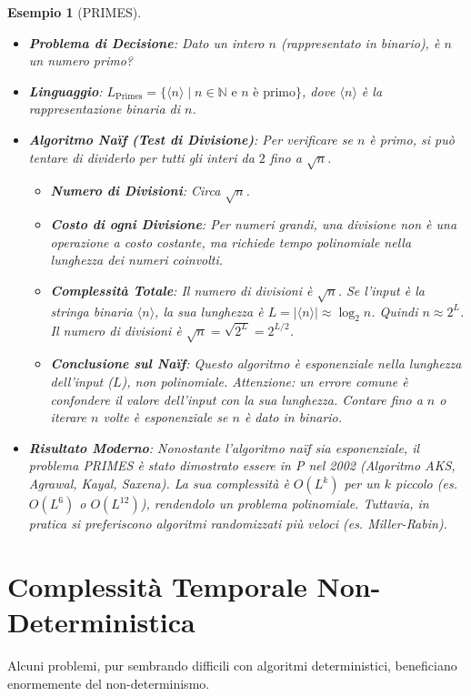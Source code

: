 \documentclass[a4paper]{article}
\newtheorem{example}{Esempio}[section]
\begin{document}
\begin{example}[PRIMES]
\begin{itemize}
    \item \textbf{Problema di Decisione}: Dato un intero $n$ (rappresentato in binario), è $n$ un numero primo?
    \item \textbf{Linguaggio}: $L_{\text{Primes}} = \{ \langle n \rangle \mid n \in \mathbb{N} \text{ e } n \text{ è primo} \}$, dove $\langle n \rangle$ è la rappresentazione binaria di $n$.
    \item \textbf{Algoritmo Naïf (Test di Divisione)}: Per verificare se $n$ è primo, si può tentare di dividerlo per tutti gli interi da $2$ fino a $\sqrt{n}$.
        \begin{itemize}
            \item \textbf{Numero di Divisioni}: Circa $\sqrt{n}$.
            \item \textbf{Costo di ogni Divisione}: Per numeri grandi, una divisione non è una operazione a costo costante, ma richiede tempo polinomiale nella lunghezza dei numeri coinvolti.
            \item \textbf{Complessità Totale}: Il numero di divisioni è $\sqrt{n}$. Se l'input è la stringa binaria $\langle n \rangle$, la sua lunghezza è $L = |\langle n \rangle| \approx \log_2 n$. Quindi $n \approx 2^L$. Il numero di divisioni è $\sqrt{n} = \sqrt{2^L} = 2^{L/2}$.
            \item \textbf{Conclusione sul Naïf}: Questo algoritmo è \emph{esponenziale} nella lunghezza dell'input ($L$), non polinomiale. \emph{Attenzione}: un errore comune è confondere il valore dell'input con la sua lunghezza. Contare fino a $n$ o iterare $n$ volte è esponenziale se $n$ è dato in binario.
        \end{itemize}
    \item \textbf{Risultato Moderno}: Nonostante l'algoritmo naïf sia esponenziale, il problema PRIMES è stato dimostrato essere in P nel 2002 (Algoritmo AKS, Agrawal, Kayal, Saxena). La sua complessità è $O(L^k)$ per un $k$ piccolo (es. $O(L^6)$ o $O(L^{12})$), rendendolo un problema polinomiale. Tuttavia, in pratica si preferiscono algoritmi randomizzati più veloci (es. Miller-Rabin).
\end{itemize}
\end{example}

\section{Complessità Temporale Non-Deterministica}
Alcuni problemi, pur sembrando difficili con algoritmi deterministici, beneficiano enormemente del non-determinismo.
\end{document}
